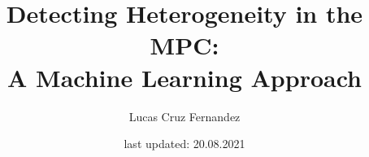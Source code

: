\documentclass[12pt]{article}
\title{Detecting Heterogeneity in the MPC: \\ A Machine Learning Approach}
\author{Lucas Cruz Fernandez}
\date{last updated: 20.08.2021}
\begin{document}














\clearpage
\small


\newpage 


\end{document}
